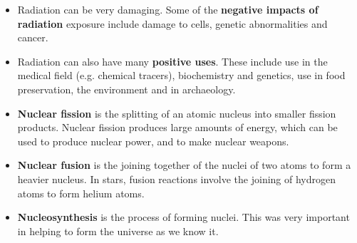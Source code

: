 \begin{itemize}
\item{Radiation can be very damaging. Some of the \textbf{negative impacts of radiation} exposure include damage to cells, genetic abnormalities and cancer.}
\item{Radiation can also have many \textbf{positive uses}. These include use in the medical field (e.g. chemical tracers), biochemistry and genetics, use in food preservation, the environment and in archaeology.}
\item{\textbf{Nuclear fission} is the splitting of an atomic nucleus into smaller fission products. Nuclear fission produces large amounts of energy, which can be used to produce nuclear power, and to make nuclear weapons.}
\item{\textbf{Nuclear fusion} is the joining together of the nuclei of two atoms to form a heavier nucleus. In stars, fusion reactions involve the joining of hydrogen atoms to form helium atoms.}
\item{\textbf{Nucleosynthesis} is the process of forming nuclei. This was very important in helping to form the universe as we know it.}
\end{itemize}


